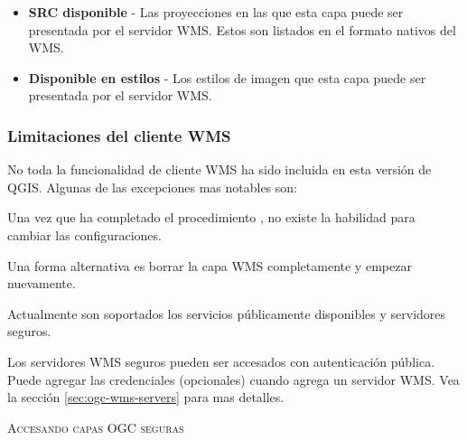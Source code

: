{\begin{itemize}
\begin{itemize}
\item \textbf{SRC disponible} - Las proyecciones en las que esta capa puede ser presentada por el servidor WMS.  Estos son listados en el formato nativos del WMS.

\item \textbf{Disponible en estilos} - Los estilos de imagen que esta capa puede ser presentada por el servidor WMS.

\end{itemize}

\end{itemize}


\subsubsection{Limitaciones del cliente WMS}\label{sec:ogc-wms-limits}

No toda la funcionalidad de cliente WMS ha sido incluida en esta versión de  QGIS.
Algunas de las excepciones mas notables son:


Una vez que ha completado el procedimiento , no existe la habilidad para cambiar las configuraciones.

Una forma alternativa es borrar la capa WMS completamente y empezar nuevamente.


Actualmente son soportados los servicios públicamente disponibles y servidores seguros.

Los servidores WMS seguros pueden ser accesados con autenticación pública. Puede agregar las credenciales (opcionales) cuando agrega un servidor WMS. Vea la sección \ref{sec:ogc-wms-servers} para mas detalles.

\begin{Tip}[ht]\caption{\textsc{Accesando capas OGC seguras}}
\end{Tip}


}
